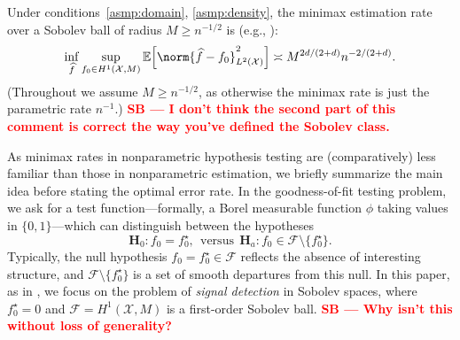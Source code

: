 \documentclass[twoside]{article}
\newcommand{\red}[1]{\textcolor{red}{#1}}
\newcommand{\sbcomment}[1]{{\bf{{\red{{SB --- #1}}}}}}
\newcommand{\1}{\mathbf{1}}
\newcommand{\Xset}{\mathcal{X}}
\newcommand{\mc}[1]{\mathcal{#1}}
\newcommand{\Ebb}{\mathbb{E}}
\newcommand{\wh}[1]{\widehat{#1}}
\theoremstyle{definition}
\theoremstyle{remark}
\begin{document}
Under conditions~\ref{asmp:domain}, \ref{asmp:density}, the minimax estimation rate over a Sobolev ball of radius $M \geq n^{-1/2}$ is (e.g., \citet{tsybakov2008_book}):
\begin{equation}
\label{eqn:sobolev_space_estimation_minimax_rate}
\inf_{\wh{f}} \sup_{f_0 \in H^1(\Xset, M)} \Ebb\Bigl[\norm{\wh{f} - f_0}_{L^2(\Xset)}^2\Bigr] \asymp M^{2d/(2 + d)} n^{-2/(2 + d)}.
\end{equation}
(Throughout we assume $M \geq n^{-1/2}$, as otherwise the minimax rate is just the parametric rate $n^{-1}$.) \sbcomment{I don't think the second part of this comment is correct the way you've defined the Sobolev class.}

As minimax rates in nonparametric hypothesis testing are (comparatively) less familiar than those in nonparametric estimation, we briefly summarize the main idea before stating the optimal error rate. In the goodness-of-fit testing problem, we ask for a test function---formally, a Borel measurable function $\phi$ taking values in $\{0,1\}$---which can distinguish between the hypotheses
\begin{equation}
\mathbf{H}_0: f_0 = f_0^{\star}, ~~\textrm{versus}~~ \mathbf{H}_a: f_0 \in \mc{F} \setminus \{f_0^{\star}\}.
\end{equation} 
Typically, the null hypothesis $f_0 = f_0^{\star} \in \mc{F}$ reflects the absence of interesting structure, and $\mc{F} \setminus  \{f_0^{\star}\}$ is a set of smooth departures from this null. In this paper, as in \citet{ingster2009}, we focus on the problem of \emph{signal detection} in Sobolev spaces, where $f_0^{\star} = 0$ and $\mc{F} = H^1(\Xset,M)$ is a first-order Sobolev ball. \sbcomment{Why isn't this without loss of generality?}
\end{document}
